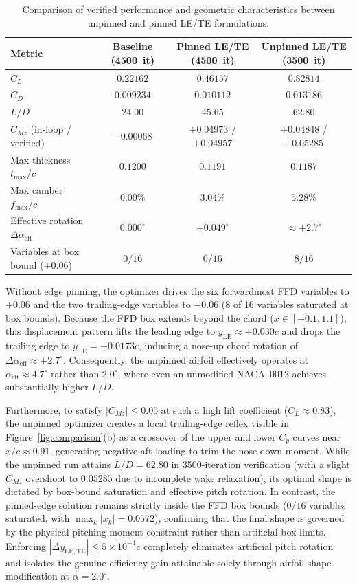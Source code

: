 \documentclass[11pt,a4paper]{article}
\begin{document}
\begin{table}[H]
\caption{Comparison of verified performance and geometric characteristics between unpinned and pinned LE/TE formulations.}
\label{tab:pinned_vs_unpinned}
\hspace{-1cm}
\begin{tabular}{lccc}
\toprule
Metric & Baseline (4500~it) & Pinned LE/TE (4500~it) & Unpinned LE/TE (3500~it) \\
\midrule
$C_L$ & $0.22162$ & $0.46157$ & $0.82814$ \\
$C_D$ & $0.009234$ & $0.010112$ & $0.013186$ \\
$L/D$ & $24.00$ & $45.65$ & $62.80$ \\
$C_{Mz}$ (in-loop / verified) & $-0.00068$ & $+0.04973$ / $+0.04957$ & $+0.04848$ / $+0.05285$ \\
Max thickness $t_{\max}/c$ & $0.1200$ & $0.1191$ & $0.1187$ \\
Max camber $f_{\max}/c$ & $0.00\%$ & $3.04\%$ & $5.28\%$ \\
Effective rotation $\Delta\alpha_{\mathrm{eff}}$ & $0.000^\circ$ & $+0.049^\circ$ & $\approx +2.7^\circ$ \\
Variables at box bound ($\pm 0.06$) & $0 / 16$ & $0 / 16$ & $8 / 16$ \\
\bottomrule
\end{tabular}
\end{table}

Without edge pinning, the optimizer drives the six forwardmost FFD variables to $+0.06$ and the two trailing-edge variables to $-0.06$ (8 of 16 variables saturated at box bounds). Because the FFD box extends beyond the chord ($x \in [-0.1, 1.1]$), this displacement pattern lifts the leading edge to $y_{\mathrm{LE}} \approx +0.030c$ and drops the trailing edge to $y_{\mathrm{TE}} = -0.0173c$, inducing a nose-up chord rotation of $\Delta\alpha_{\mathrm{eff}} \approx +2.7^\circ$. Consequently, the unpinned airfoil effectively operates at $\alpha_{\mathrm{eff}} \approx 4.7^\circ$ rather than $2.0^\circ$, where even an unmodified NACA~0012 achieves substantially higher $L/D$.

Furthermore, to satisfy $|C_{Mz}| \leq 0.05$ at such a high lift coefficient ($C_L \approx 0.83$), the unpinned optimizer creates a local trailing-edge reflex visible in Figure~\ref{fig:comparison}(b) as a crossover of the upper and lower $C_p$ curves near $x/c \approx 0.91$, generating negative aft loading to trim the nose-down moment. While the unpinned run attains $L/D = 62.80$ in 3500-iteration verification (with a slight $C_{Mz}$ overshoot to $0.05285$ due to incomplete wake relaxation), its optimal shape is dictated by box-bound saturation and effective pitch rotation. In contrast, the pinned-edge solution remains strictly inside the FFD box bounds ($0/16$ variables saturated, with $\max_k |x_k| = 0.0572$), confirming that the final shape is governed by the physical pitching-moment constraint rather than artificial box limits. Enforcing $|\Delta y_{\mathrm{LE,TE}}| \leq 5\times 10^{-4}c$ completely eliminates artificial pitch rotation and isolates the genuine efficiency gain attainable solely through airfoil shape modification at $\alpha = 2.0^\circ$.
\end{document}

